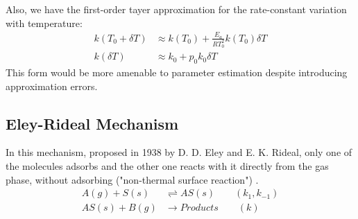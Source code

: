 Also, we have the first-order tayer approximation for the rate-constant
variation with temperature:
\begin{align*}
    k(T_0 + \delta T) &\approx k(T_0) + \frac{E_a}{RT_0^2} k(T_0) \delta T\\
    k(\delta T) &\approx k_0 + p_0k_0 \delta T
\end{align*}
This form would be more amenable to parameter estimation despite introducing
approximation errors.



\subsection{Eley-Rideal Mechanism}
In this mechanism, proposed in 1938 by D. D. Eley and E. K. Rideal, only one of
the molecules adsorbs and the other one reacts with it directly from the gas
phase, without adsorbing ("non-thermal surface reaction") \cite{eley_rideal}.
\begin{align*}
    A(g) + S(s) &\rightleftharpoons AS(s)  \qquad (k_1, k_{-1})\\
    AS(s) + B(g) &\longrightarrow Products \qquad (k)
\end{align*}

